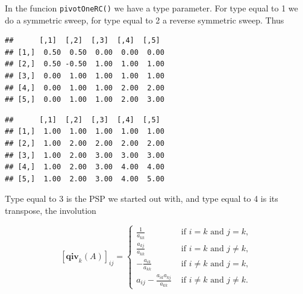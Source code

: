 \documentclass[12pt,]{article}
\newenvironment{Shaded}{\begin{snugshade}}{\end{snugshade}}
\newcommand{\KeywordTok}[1]{\textcolor[rgb]{0.13,0.29,0.53}{\textbf{#1}}}
\newcommand{\DataTypeTok}[1]{\textcolor[rgb]{0.13,0.29,0.53}{#1}}
\newcommand{\DecValTok}[1]{\textcolor[rgb]{0.00,0.00,0.81}{#1}}
\newcommand{\OperatorTok}[1]{\textcolor[rgb]{0.81,0.36,0.00}{\textbf{#1}}}
\newcommand{\NormalTok}[1]{#1}
\begin{document}
In the funcion \texttt{pivotOneRC()} we have a type parameter. For type
equal to 1 we do a symmetric sweep, for type equal to 2 a reverse
symmetric sweep. Thus

\begin{Shaded}
\end{Shaded}

\begin{verbatim}
##      [,1]  [,2]  [,3]  [,4]  [,5] 
## [1,]  0.50  0.50  0.00  0.00  0.00
## [2,]  0.50 -0.50  1.00  1.00  1.00
## [3,]  0.00  1.00  1.00  1.00  1.00
## [4,]  0.00  1.00  1.00  2.00  2.00
## [5,]  0.00  1.00  1.00  2.00  3.00
\end{verbatim}

\begin{Shaded}
\end{Shaded}

\begin{verbatim}
##      [,1]  [,2]  [,3]  [,4]  [,5] 
## [1,]  1.00  1.00  1.00  1.00  1.00
## [2,]  1.00  2.00  2.00  2.00  2.00
## [3,]  1.00  2.00  3.00  3.00  3.00
## [4,]  1.00  2.00  3.00  4.00  4.00
## [5,]  1.00  2.00  3.00  4.00  5.00
\end{verbatim}

Type equal to 3 is the PSP we started out with, and type equal to 4 is
its transpose, the involution

\begin{equation}\label{E:qiv}
[\mathbf{qiv}_k(A)]_{ij}=
\begin{cases}
\frac{1}{a_{kk}}&\text{ if }i=k\text{ and }j=k,\\
\frac{a_{kj}}{a_{kk}}&\text{ if }i=k\text{ and }j\not=k,\\
-\frac{a_{ik}}{a_{kk}}&\text{ if }i\not=k\text{ and }j=k,\\
a_{ij}-\frac{a_{ik}a_{kj}}{a_{kk}}&\text{ if }i\not=k\text{ and }j\not=k.
\end{cases}
\end{equation}
\end{document}

